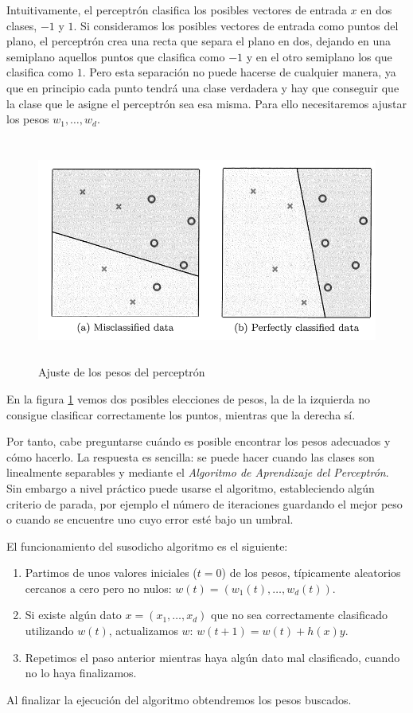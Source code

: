 \documentclass[11pt,twoside,titlepage,a4paper]{article}
\numberwithin{equation}{section} %
\theoremstyle{usual}
\begin{document}
    Intuitivamente, el perceptrón clasifica los posibles vectores de entrada $x$ en dos clases, $-1$ y $1$. Si consideramos los posibles vectores de entrada como puntos del plano, el perceptrón crea una recta que separa el plano en dos, dejando en una semiplano aquellos puntos que clasifica como $-1$ y en el otro semiplano los que clasifica como $1$. Pero esta separación no puede hacerse de cualquier manera, ya que en principio cada punto tendrá una clase verdadera y hay que conseguir que la clase que le asigne el perceptrón sea esa misma. Para ello necesitaremos ajustar los pesos $w_1, \dots, w_d$.
    
    \begin{figure}[!h]
        \centering
        \includegraphics[height=20em]{Source/images/ajuste_pesos_perceptron.png}
        \caption{Ajuste de los pesos del perceptrón}
        \label{fig:ajuste_pesos_perceptron}
    \end{figure}
    
    En la figura \ref{fig:ajuste_pesos_perceptron} vemos dos posibles elecciones de pesos, la de la izquierda no consigue clasificar correctamente los puntos, mientras que la derecha sí.
    
    Por tanto, cabe preguntarse cuándo es posible encontrar los pesos adecuados y cómo hacerlo. La respuesta es sencilla: se puede hacer cuando las clases son linealmente separables y mediante el \textit{Algoritmo de Aprendizaje del Perceptrón}. Sin embargo a nivel práctico puede usarse el algoritmo, estableciendo algún criterio de parada, por ejemplo el número de iteraciones guardando el mejor peso o  cuando se encuentre uno cuyo error esté bajo un umbral. 
    
    El funcionamiento del susodicho algoritmo es el siguiente:
    \begin{enumerate}
        \item Partimos de unos valores iniciales ($t=0$) de los pesos, típicamente aleatorios cercanos a cero pero no nulos: $w(t) = (w_1(t), \dots, w_d(t))$.
        \item Si existe algún dato $x = (x_1, \dots, x_d)$ que no sea correctamente clasificado utilizando $w(t)$, actualizamos $w$: $w(t+1)=w(t) + h(x)y$.
        \item Repetimos el paso anterior mientras haya algún dato mal clasificado, cuando no lo haya finalizamos.
    \end{enumerate}
    Al finalizar la ejecución del algoritmo obtendremos los pesos buscados.
    
\end{document}
